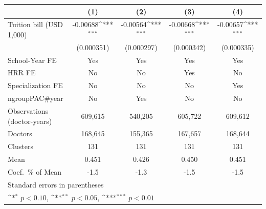 {
\def\sym#1{\ifmmode^{#1}\else\(^{#1}\)\fi}
\begin{tabular}{l*{4}{c}}
\hline\hline
                    &\multicolumn{1}{c}{(1)}         &\multicolumn{1}{c}{(2)}         &\multicolumn{1}{c}{(3)}         &\multicolumn{1}{c}{(4)}         \\
\hline
Tuition bill (USD 1,000)&    -0.00688\sym{***}&    -0.00564\sym{***}&    -0.00668\sym{***}&    -0.00657\sym{***}\\
                    &  (0.000351)         &  (0.000297)         &  (0.000342)         &  (0.000335)         \\
[1em]
School-Year FE      &         Yes         &         Yes         &         Yes         &         Yes         \\
[1em]
HRR FE              &          No         &          No         &         Yes         &          No         \\
[1em]
Specialization FE   &          No         &          No         &          No         &         Yes         \\
[1em]
ngroupPAC#year      &          No         &         Yes         &          No         &          No         \\
\hline
Observations (doctor-years)&     609,615         &     540,205         &     605,722         &     609,612         \\
Doctors             &     168,645         &     155,365         &     167,657         &     168,644         \\
Clusters            &         131         &         131         &         131         &         131         \\
Mean                &       0.451         &       0.426         &       0.450         &       0.451         \\
Coef.\ \% of Mean   &        -1.5         &        -1.3         &        -1.5         &        -1.5         \\
\hline\hline
\multicolumn{5}{l}{\footnotesize Standard errors in parentheses}\\
\multicolumn{5}{l}{\footnotesize \sym{*} \(p<0.10\), \sym{**} \(p<0.05\), \sym{***} \(p<0.01\)}\\
\end{tabular}
}
